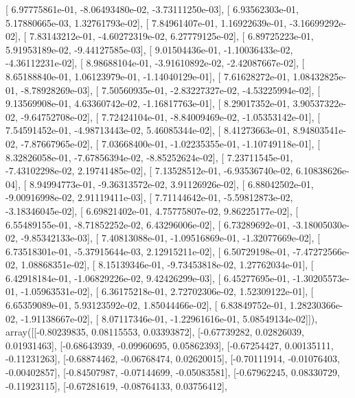 \documentclass{article}
\begin{document}
       [  6.97775861e-01,  -8.06493480e-02,  -3.73111250e-03],
       [  6.93562303e-01,   5.17880665e-03,   1.32761793e-02],
       [  7.84961407e-01,   1.16922639e-01,  -3.16699292e-02],
       [  7.83143212e-01,  -4.60272319e-02,   6.27779125e-02],
       [  6.89725223e-01,   5.91953189e-02,  -9.44127585e-03],
       [  9.01504436e-01,  -1.10036433e-02,  -4.36112231e-02],
       [  8.98688104e-01,  -3.91610892e-02,  -2.42087667e-02],
       [  8.65188840e-01,   1.06123979e-01,  -1.14040129e-01],
       [  7.61628272e-01,   1.08432825e-01,  -8.78928269e-03],
       [  7.50560935e-01,  -2.83227327e-02,  -4.53225994e-02],
       [  9.13569908e-01,   4.63360742e-02,  -1.16817763e-01],
       [  8.29017352e-01,   3.90537322e-02,  -9.64752708e-02],
       [  7.72424104e-01,  -8.84009469e-02,  -1.05353142e-01],
       [  7.54591452e-01,  -4.98713443e-02,   5.46085344e-02],
       [  8.41273663e-01,   8.94803541e-02,  -7.87667965e-02],
       [  7.03668400e-01,  -1.02235355e-01,  -1.10749118e-01],
       [  8.32826058e-01,  -7.67856394e-02,  -8.85252624e-02],
       [  7.23711545e-01,  -7.43102298e-02,   2.19741485e-02],
       [  7.13528512e-01,  -6.93536740e-02,   6.10838626e-04],
       [  8.94994773e-01,  -9.36313572e-02,   3.91126926e-02],
       [  6.88042502e-01,  -9.00916998e-02,   2.91119411e-03],
       [  7.71144642e-01,  -5.59812873e-02,  -3.18346045e-02],
       [  6.69821402e-01,   4.75775807e-02,   9.86225177e-02],
       [  6.55489155e-01,  -8.71852252e-02,   6.43296006e-02],
       [  6.73289692e-01,  -3.18005030e-02,  -9.85342133e-03],
       [  7.40813088e-01,  -1.09516869e-01,  -1.32077669e-02],
       [  6.73518301e-01,  -5.37915644e-03,   2.12915211e-02],
       [  6.50729198e-01,  -7.47272566e-02,   1.08868351e-02],
       [  8.15139346e-01,  -9.73453818e-02,   1.27762034e-01],
       [  6.42918184e-01,  -1.06829226e-02,   9.42426299e-03],
       [  6.45277695e-01,  -1.30205573e-01,  -1.05963531e-02],
       [  6.36175218e-01,   2.72702306e-02,   1.52309122e-01],
       [  6.65359089e-01,   5.93123592e-02,   1.85044466e-02],
       [  6.83849752e-01,   1.28230366e-02,  -1.91138667e-02],
       [  8.07117346e-01,  -1.22961616e-01,   5.08549134e-02]]), array([[-0.80239835,  0.08115553,  0.03393872],
       [-0.67739282,  0.02826039,  0.01931463],
       [-0.68643939, -0.09960695,  0.05862393],
       [-0.67254427,  0.00135111, -0.11231263],
       [-0.68874462, -0.06768474,  0.02620015],
       [-0.70111914, -0.01076403, -0.00402857],
       [-0.84507987, -0.07144699, -0.05083581],
       [-0.67962245,  0.08330729, -0.11923115],
       [-0.67281619, -0.08764133,  0.03756412],
\end{document}

